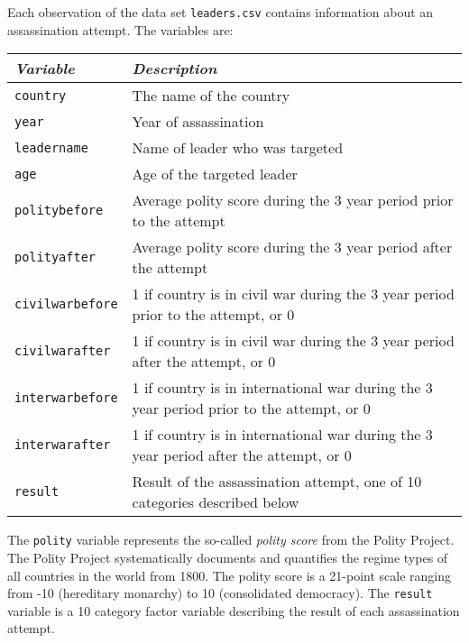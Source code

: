 \documentclass[11pt]{article}
\begin{document}
 Each observation of the data set
{\tt leaders.csv} contains information about an assassination
attempt.  The variables are:
\begin{center}
\begin{tabular}{l p{14.4cm}}
 \hline
\textit{Variable} & \textit{Description} \\
\hline
{\tt country} &           The name of the country \\
{\tt year} &               Year of assassination \\
{\tt leadername} &         Name of leader who was targeted \\
{\tt age}       &         Age of the targeted leader \\
{\tt politybefore} &       Average polity score during the 3 year period prior to the attempt \\
 {\tt polityafter} &        Average polity score during the 3 year period after the attempt\\
{\tt civilwarbefore} &     1 if country is in civil war during the 3 year period prior to the attempt, or 0 \\
 {\tt civilwarafter} &      1 if country is in civil war during the 3 year period after the attempt, or 0 \\
{\tt interwarbefore} &     1 if country is in international war during the 3 year period prior to the attempt, or 0 \\
 {\tt interwarafter} &      1 if country is in international war during the 3 year period after the attempt, or 0 \\
{\tt result} &             Result of the assassination attempt, one of 10 categories described below \\
\hline
\end{tabular}
\end{center}
\vspace{2mm}

The {\tt polity} variable represents the so-called \textit{polity score}
from the Polity Project.  The Polity Project systematically documents
and quantifies the regime types of all countries in the world from
1800.  The polity score is a 21-point scale ranging from -10
(hereditary monarchy) to 10 (consolidated democracy).  The {\tt result} variable is a 10 category factor variable describing
the result of each assassination attempt.
\end{document}
